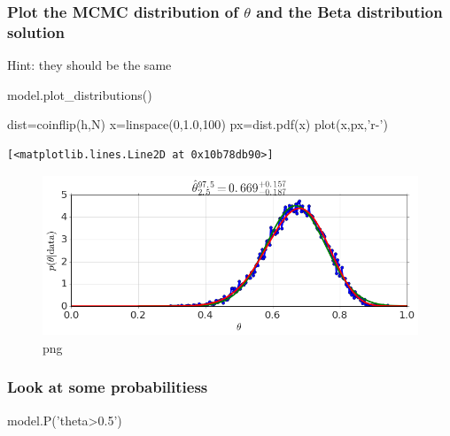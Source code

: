 \documentclass[]{article}
\newenvironment{Shaded}{}{}
\newcommand{\DecValTok}[1]{\textcolor[rgb]{0.25,0.63,0.44}{{#1}}}
\newcommand{\FloatTok}[1]{\textcolor[rgb]{0.25,0.63,0.44}{{#1}}}
\newcommand{\StringTok}[1]{\textcolor[rgb]{0.25,0.44,0.63}{{#1}}}
\newcommand{\NormalTok}[1]{{#1}}
\begin{document}
\subsubsection{\texorpdfstring{Plot the MCMC distribution of \(\theta\)
and the Beta distribution
solution}{Plot the MCMC distribution of \textbackslash{}theta and the Beta distribution solution}}\label{plot-the-mcmc-distribution-of-theta-and-the-beta-distribution-solution}

Hint: they should be the same

\begin{Shaded}
\begin{Highlighting}[]
\NormalTok{model.plot_distributions()}

\NormalTok{dist=coinflip(h,N)}
\NormalTok{x=linspace(}\DecValTok{0}\NormalTok{,}\FloatTok{1.0}\NormalTok{,}\DecValTok{100}\NormalTok{)}
\NormalTok{px=dist.pdf(x)}
\NormalTok{plot(x,px,}\StringTok{'r-'}\NormalTok{)}
\end{Highlighting}
\end{Shaded}

\begin{verbatim}
[<matplotlib.lines.Line2D at 0x10b78db90>]
\end{verbatim}

\begin{figure}[htbp]
\centering
\includegraphics{output_10_1.png}
\caption{png}
\end{figure}

\subsubsection{Look at some
probabilitiess}\label{look-at-some-probabilitiess}

\begin{Shaded}
\begin{Highlighting}[]
\NormalTok{model.P(}\StringTok{'theta>0.5'}\NormalTok{)}
\end{Highlighting}
\end{Shaded}
\end{document}
